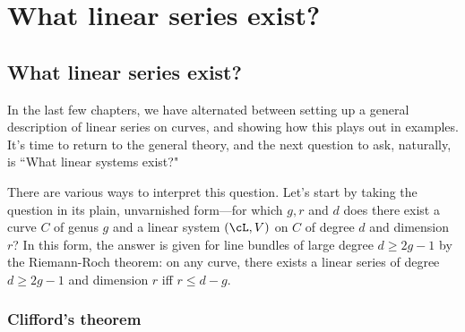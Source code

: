 
%
%
%
%
%
%

\chapter{What linear series exist?}\label{Brill-Noether}

\section{What linear series exist?}

In the last few chapters, we have alternated between setting up a general description of linear series on curves, and showing how this plays out in examples. It's time to return to the general theory, and the next question to ask, naturally, is ``What linear systems exist?"

There are various ways to interpret this question. Let's start by taking the question in its plain, unvarnished form---for which $g, r$ and $d$ does there exist a curve $C$ of genus $g$ and a linear system $(\cL,V)$ on $C$ of degree $d$ and dimension $r$? In this form, the answer is given for line bundles of large degree $d \geq 2g-1$ by the Riemann-Roch theorem: on any curve, there exists a linear series of degree $d \geq 2g-1$ and dimension $r$ iff $r \leq d-g$. 

\subsection{Clifford's theorem} 

